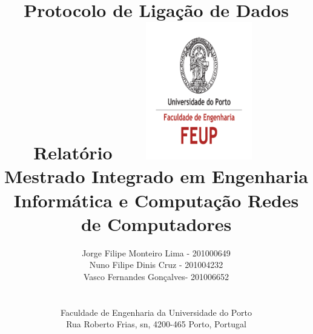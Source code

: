 \documentclass[a4paper,11pt]{article}
\begin{document}
\lstset{breaklines=true}
\setlength{\textheight}{22cm}

\title{\Huge\textbf{Protocolo de Ligação de Dados}\linebreak\linebreak\linebreak
\Large\textbf{Relatório}\linebreak\linebreak
\includegraphics[height=6cm, width=7cm]{feup.pdf}\linebreak \linebreak
\Large{Mestrado Integrado em Engenharia Informática e Computação} \linebreak \linebreak
\Large{Redes de Computadores}\linebreak
}

\author{
Jorge Filipe Monteiro Lima - 201000649
\\ Nuno Filipe Dinis Cruz - 201004232 
\\ Vasco Fernandes Gonçalves- 201006652 \\\linebreak\linebreak \\
 \\ Faculdade de Engenharia da Universidade do Porto \\ Rua Roberto Frias, s\/n, 4200-465 Porto, Portugal \linebreak\linebreak\linebreak
\linebreak\linebreak\vspace{1cm}}
\maketitle
\thispagestyle{empty}
\end{document}
